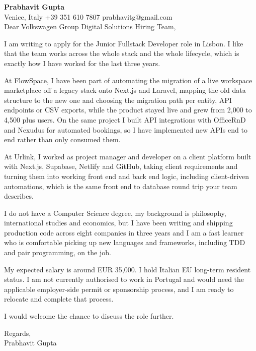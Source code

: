 \documentclass[a4paper,10.5pt]{article}
\begin{document}
\textbf{Prabhavit Gupta}\\
Venice, Italy \textbar{} +39 351 610 7807 \textbar{} prabhavitg@gmail.com\\[10pt]
Dear Volkswagen Group Digital Solutions Hiring Team,

I am writing to apply for the Junior Fullstack Developer role in Lisbon. I like that the team works across the whole stack and the whole lifecycle, which is exactly how I have worked for the last three years.

At FlowSpace, I have been part of automating the migration of a live workspace marketplace off a legacy stack onto Next.js and Laravel, mapping the old data structure to the new one and choosing the migration path per entity, API endpoints or CSV exports, while the product stayed live and grew from 2,000 to 4,500 plus users. On the same project I built API integrations with OfficeRnD and Nexudus for automated bookings, so I have implemented new APIs end to end rather than only consumed them.

At Urlink, I worked as project manager and developer on a client platform built with Next.js, Supabase, Netlify and GitHub, taking client requirements and turning them into working front end and back end logic, including client-driven automations, which is the same front end to database round trip your team describes.

I do not have a Computer Science degree, my background is philosophy, international studies and economics, but I have been writing and shipping production code across eight companies in three years and I am a fast learner who is comfortable picking up new languages and frameworks, including TDD and pair programming, on the job.

My expected salary is around EUR 35,000. I hold Italian EU long-term resident status. I am not currently authorised to work in Portugal and would need the applicable employer-side permit or sponsorship process, and I am ready to relocate and complete that process.

I would welcome the chance to discuss the role further.

Regards,\\
Prabhavit Gupta
\end{document}
